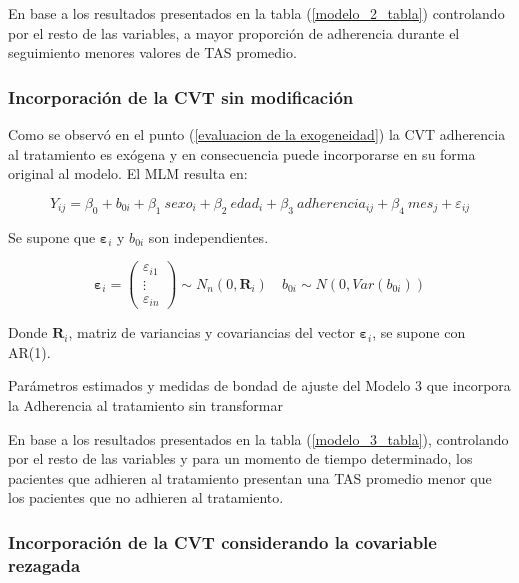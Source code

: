 \documentclass[spanish]{article}
\numberwithin{figure}{subsection}
\numberwithin{equation}{subsection}
\numberwithin{table}{subsection}
\begin{document}
En base a los resultados presentados en la tabla (\ref{modelo_2_tabla})
controlando por el resto de las variables, a mayor proporción de adherencia
durante el seguimiento menores valores de TAS promedio.

\subsubsection{Incorporación de la CVT sin modificación}

Como se observó en el punto (\ref{evaluacion de la exogeneidad}) la CVT
adherencia al tratamiento es exógena y en consecuencia puede incorporarse en su
forma original al modelo. El MLM resulta en:

\begin{equation}
	\label{modelo_3}
	Y_{ij} = \beta_0 + b_{0i} + \beta_1\ sexo_i + \beta_2\ edad_i + \beta_3\ adherencia_{ij}
	+ \beta_4\ mes_j + \varepsilon_{ij}
\end{equation}

Se supone que $\bm{\varepsilon}_i$ y $b_{0i}$ son independientes.

\[ 
	\bm{\varepsilon}_i = \begin{pmatrix} \varepsilon_{i1} \\ \vdots \\ \varepsilon_{in} \end{pmatrix} \sim N_{n}(0, \bm{R}_i)
	\quad
	b_{0i} \sim N(0, Var(b_{0i}))
\]

Donde $\bm{R}_i$, matriz de variancias y covariancias del vector
$\bm{\varepsilon}_{i}$, se supone con AR(1).

\begin{table}[H]
	\centering
	\caption{Parámetros estimados y medidas de bondad de ajuste del Modelo 3 que incorpora la Adherencia al tratamiento sin transformar}
	\label{modelo_3_tabla}
	
\end{table}

En base a los resultados presentados en la tabla (\ref{modelo_3_tabla}),
controlando por el resto de las variables y para un momento de tiempo
determinado, los pacientes que adhieren al tratamiento presentan una TAS
promedio menor que los pacientes que no adhieren al tratamiento.

\subsubsection{Incorporación de la CVT considerando la covariable rezagada}
\end{document}
